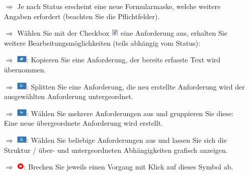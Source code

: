 \documentclass{article}
\begin{document}
\begin{multicols}{2}
\begin{tcolorbox}[colback=blue!5,colframe=blue!40!black,title=Status ändern]
\begin{itemize}
\end{itemize}
\end{tcolorbox}


\begin{tcolorbox}[colback=blue!5,colframe=blue!40!black,title=Weitere Hinweise und Funktionen]
\begin{itemize}
  \item[$\Longrightarrow$] Je nach Status erscheint eine neue Formularmaske, welche weitere Angaben erfordert (beachten Sie die Pflichtfelder).
  \item[$\Longrightarrow$] Wählen Sie mit der Checkbox \includegraphics[height=10pt]{Icons/checkbox_markiert.png} eine Anforderung aus, erhalten Sie weitere Bearbeitungsmöglichkeiten (teils abhängig vom Status):
  \item[$\Longrightarrow$] \includegraphics[height=10pt]{Icons/A_Kopieren.jpg}: Kopieren Sie eine Anforderung, der bereits erfasste Text wird übernommen.
	\item[$\Longrightarrow$] \includegraphics[height=10pt]{Icons/A_Splitten.jpg}: Splitten Sie eine Anforderung, die neu erstellte Anforderung wird der ausgewählten Anforderung untergeordnet.
	\item[$\Longrightarrow$] \includegraphics[height=10pt]{Icons/A_Gruppieren.jpg}: Wählen Sie mehrere Anforderungen aus und gruppieren Sie diese: Eine neue übergeordnete Anforderung wird erstellt.
	\item[$\Longrightarrow$] \includegraphics[height=10pt]{Icons/A_Anforderungsbaum.jpg}: Wählen Sie beliebige Anforderungen aus und lassen Sie sich die Struktur / über- und untergeordneten Abhängigkeiten grafisch anzeigen.
	\item[$\Longrightarrow$] \includegraphics[height=10pt]{Icons/Abbrechen_r.png}: Brechen Sie jeweils einen Vorgang mit Klick auf dieses Symbol ab.
\end{itemize}
\end{tcolorbox}


\end{multicols}
\end{document}
